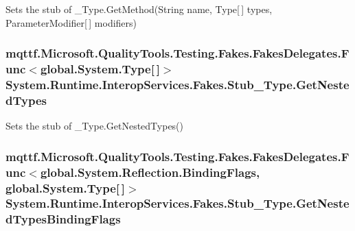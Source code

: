 Sets the stub of \-\_\-\-Type.\-Get\-Method(\-String name, Type\mbox{[}$\,$\mbox{]} types, Parameter\-Modifier\mbox{[}$\,$\mbox{]} modifiers)

\hypertarget{class_system_1_1_runtime_1_1_interop_services_1_1_fakes_1_1_stub___type_af8f1cdf1d2775ac8d6aa6e9168677adf}{
\subsubsection[{Get\-Nested\-Types}]{\setlength{\rightskip}{0pt plus 5cm}mqttf.\-Microsoft.\-Quality\-Tools.\-Testing.\-Fakes.\-Fakes\-Delegates.\-Func$<$global.\-System.\-Type\mbox{[}$\,$\mbox{]}$>$ System.\-Runtime.\-Interop\-Services.\-Fakes.\-Stub\-\_\-\-Type.\-Get\-Nested\-Types}}\label{class_system_1_1_runtime_1_1_interop_services_1_1_fakes_1_1_stub___type_af8f1cdf1d2775ac8d6aa6e9168677adf}


Sets the stub of \-\_\-\-Type.\-Get\-Nested\-Types()

\hypertarget{class_system_1_1_runtime_1_1_interop_services_1_1_fakes_1_1_stub___type_a5eeb5aacbbef426704c3110343d3a7ef}{
\subsubsection[{Get\-Nested\-Types\-Binding\-Flags}]{\setlength{\rightskip}{0pt plus 5cm}mqttf.\-Microsoft.\-Quality\-Tools.\-Testing.\-Fakes.\-Fakes\-Delegates.\-Func$<$global.\-System.\-Reflection.\-Binding\-Flags, global.\-System.\-Type\mbox{[}$\,$\mbox{]}$>$ System.\-Runtime.\-Interop\-Services.\-Fakes.\-Stub\-\_\-\-Type.\-Get\-Nested\-Types\-Binding\-Flags}}\label{class_system_1_1_runtime_1_1_interop_services_1_1_fakes_1_1_stub___type_a5eeb5aacbbef426704c3110343d3a7ef}


